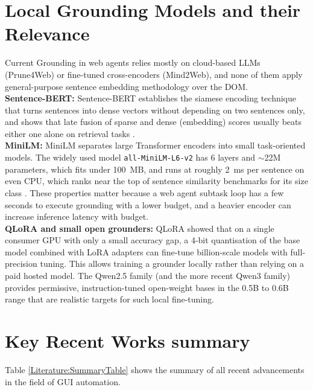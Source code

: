 \section{Local Grounding Models and their Relevance}
Current Grounding in web agents relies mostly on cloud-based LLMs (Prune4Web) or fine-tuned cross-encoders (Mind2Web), and none of them apply general-purpose sentence embedding methodology over the DOM. \\
\textbf{Sentence-BERT:}
Sentence-BERT \cite{reimers2019sbert} establishes the siamese encoding technique that turns sentences into dense vectors without depending on two sentences only, and shows that late fusion of sparse and dense (embedding) scores usually beats either one alone on retrieval tasks \cite{reimers2019sbert}.\\
\textbf{MiniLM:}
MiniLM \cite{wang2020minilm} separates large Transformer encoders into small task-oriented models. The widely used model \texttt{all-MiniLM-L6-v2} has 6 layers and $\sim$22M parameters, which fits under 100~MB, and runs at roughly 2~ms per sentence on even CPU, which ranks near the top of sentence similarity benchmarks for its size class \cite{wang2020minilm}. These properties matter because a web agent subtask loop has a few seconds to execute grounding with a lower budget, and a heavier encoder can increase inference latency with budget.\\
\textbf{QLoRA and small open grounders:} QLoRA \cite{dettmers2023qlora} showed that on a single consumer GPU with only a small accuracy gap, a 4-bit quantisation of the base model combined with LoRA adapters can fine-tune billion-scale models with full-precision tuning. This allows training a grounder locally rather than relying on a paid hosted model. The Qwen2.5 \cite{qwen25techreport2024} family (and the more recent Qwen3 family) provides permissive, instruction-tuned open-weight bases in the 0.5B to 0.6B range that are realistic targets for such local fine-tuning.



\section{Key Recent Works summary}
Table \ref{Literature:SummaryTable} shows the summary of all recent advancements in the field of GUI automation.

